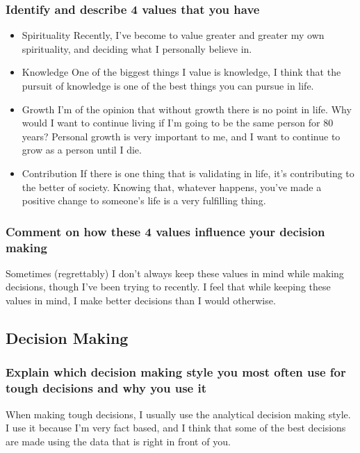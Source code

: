 \documentclass[11pt]{article}
\begin{document}
\subsubsection*{Identify and describe 4 values that you have}
\label{sec:org418e8c1}
\begin{itemize}
\item Spirituality
\label{sec:orgc77c3c9}
Recently, I've become to value greater and greater my own spirituality, and deciding what I personally believe in. 
\item Knowledge
\label{sec:orgde0db99}
One of the biggest things I value is knowledge, I think that the pursuit of knowledge is one of the best things you can pursue in life.
\item Growth
\label{sec:org912b363}
I'm of the opinion that without growth there is no point in life. Why would I want to continue living if I'm going to be the same person for 80 years? Personal growth is very important to me, and I want to continue to grow as a person until I die. 
\item Contribution
\label{sec:org6528c81}
If there is one thing that is validating in life, it's contributing to the better of society. Knowing that, whatever happens, you've made a positive change to someone's life is a very fulfilling thing.
\end{itemize}
\subsubsection*{Comment on how these 4 values influence your decision making}
\label{sec:org1bed05d}
Sometimes (regrettably) I don't always keep these values in mind while making decisions, though I've been trying to recently. I feel that while keeping these values in mind, I make better decisions than I would otherwise.
\subsection*{Decision Making}
\label{sec:org84953ee}
\subsubsection*{Explain which decision making style you most often use for tough decisions and why you use it}
\label{sec:org03a95e2}
When making tough decisions, I usually use the analytical decision making style. I use it because I'm very fact based, and I think that some of the best decisions are made using the data that is right in front of you.
\end{document}
